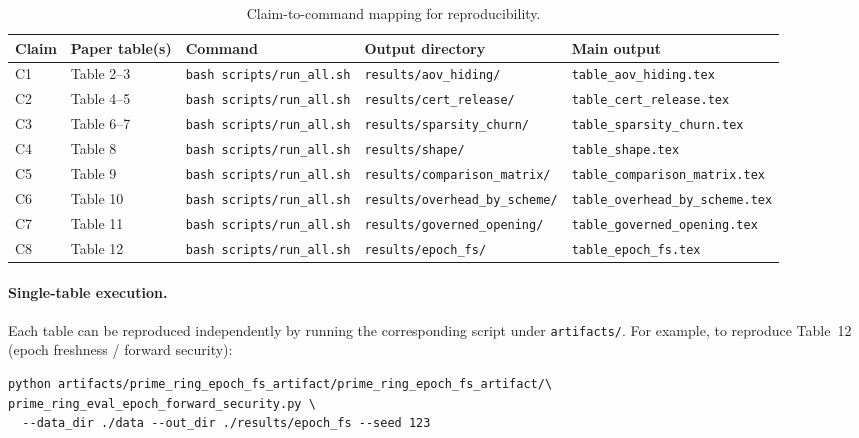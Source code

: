 \documentclass[letterpaper,twocolumn,10pt]{article}
\begin{document}
\begin{table}[t]
\centering
\small
\begin{tabular}{lllll}
\toprule
Claim & Paper table(s) & Command & Output directory & Main output \\
\midrule
C1 & Table 2--3 & \texttt{bash scripts/run\_all.sh} & \texttt{results/aov\_hiding/} & \texttt{table\_aov\_hiding.tex} \\
C2 & Table 4--5 & \texttt{bash scripts/run\_all.sh} & \texttt{results/cert\_release/} & \texttt{table\_cert\_release.tex} \\
C3 & Table 6--7 & \texttt{bash scripts/run\_all.sh} & \texttt{results/sparsity\_churn/} & \texttt{table\_sparsity\_churn.tex} \\
C4 & Table 8 & \texttt{bash scripts/run\_all.sh} & \texttt{results/shape/} & \texttt{table\_shape.tex} \\
C5 & Table 9 & \texttt{bash scripts/run\_all.sh} & \texttt{results/comparison\_matrix/} & \texttt{table\_comparison\_matrix.tex} \\
C6 & Table 10 & \texttt{bash scripts/run\_all.sh} & \texttt{results/overhead\_by\_scheme/} & \texttt{table\_overhead\_by\_scheme.tex} \\
C7 & Table 11 & \texttt{bash scripts/run\_all.sh} & \texttt{results/governed\_opening/} & \texttt{table\_governed\_opening.tex} \\
C8 & Table 12 & \texttt{bash scripts/run\_all.sh} & \texttt{results/epoch\_fs/} & \texttt{table\_epoch\_fs.tex} \\
\bottomrule
\end{tabular}
\caption{Claim-to-command mapping for reproducibility.}
\label{tab:claims}
\end{table}

\paragraph{Single-table execution.}
Each table can be reproduced independently by running the corresponding script under \texttt{artifacts/}. For example, to reproduce Table~12 (epoch freshness / forward security):
\begin{lstlisting}[basicstyle=\ttfamily\small]
python artifacts/prime_ring_epoch_fs_artifact/prime_ring_epoch_fs_artifact/\
prime_ring_eval_epoch_forward_security.py \
  --data_dir ./data --out_dir ./results/epoch_fs --seed 123
\end{lstlisting}
\end{document}
